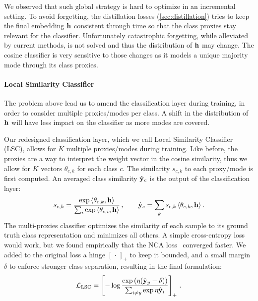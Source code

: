 We observed that such global strategy is hard to optimize in an incremental setting. To avoid
forgetting, the distillation losses (\autoref{sec:distillation}) tries to keep the final embedding
$\mathbf{h}$ consistent through time so that the class proxies stay relevant for the classifier.
Unfortunately catastrophic forgetting, while alleviated by current methods, is not solved and thus
the distribution of $\mathbf{h}$ may change. The cosine classifier is very sensitive to those changes as it
models a unique majority mode through its class proxies.


\paragraph{Local Similarity Classifier} The problem above lead us to amend the classification layer
during training, in order to consider multiple proxies/modes per class. A shift in the distribution
of $\mathbf{h}$ will have less impact on the classifier as more modes are covered.


Our redesigned classification layer, which we call Local Similarity Classifier (LSC), allows for $K$
multiple proxies/modes during training. Like before, the proxies are a way to interpret the weight
vector in the cosine similarity, thus we allow for $K$ vectors $\theta_{c,k}$ for each class $c$.
The similarity $s_{c,k}$ to each proxy/mode is first computed. An averaged class similarity $\hat{\mathbf{y}}_c$
is the output of the classification layer:
%
\begin{equation}
    s_{c,k} =\frac{\exp\,\langle\theta_{c,k},\mathbf{h}\rangle}{\sum_{i} \exp\,\langle\theta_{c,i},\mathbf{h}\rangle}\,, \qquad
    \hat{\mathbf{y}}_c = \sum_{k}s_{c,k}\,\langle\theta_{c,k},\mathbf{h}\rangle\,.
\end{equation}
%
The multi-proxies classifier optimizes the similarity of each sample to its ground truth class
representation and minimizes all others. A simple cross-entropy loss would work, but we found
empirically that the NCA loss~\cite{goldberger2005nca_loss,attias2017proxynca} converged faster. We
added to the original loss a hinge $[\,\cdot\,]_+$ to keep it bounded, and a small margin $\delta$
to enforce stronger class separation, resulting in the final formulation:
%
\begin{equation}
    \mathcal{L}_\text{LSC} = \left[- \log\frac{\exp\left(\eta (\hat{\mathbf{y}}_y - \delta)\right)}{\sum_{i \neq y} \exp \eta \hat{\mathbf{y}}_{i}} \right]_+ \,.
\end{equation}

